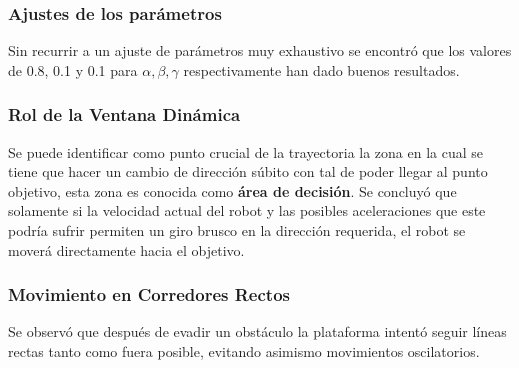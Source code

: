 \documentclass[10pt]{article}
\begin{document}
\subsubsection*{Ajustes de los parámetros}
Sin recurrir a un ajuste de parámetros muy exhaustivo se encontró que los valores de 0.8, 0.1 y 0.1 para $\alpha, \beta, \gamma$ respectivamente han dado buenos resultados.

\subsubsection*{Rol de la Ventana Dinámica}
Se puede identificar como punto crucial de la trayectoria la zona en la cual se tiene que hacer un cambio de dirección súbito con tal de poder llegar al punto objetivo, esta zona es conocida como \textbf{área de decisión}. Se concluyó que solamente si la velocidad actual del robot y las posibles aceleraciones que este podría sufrir permiten un giro brusco en la dirección requerida, el robot se moverá directamente hacia el objetivo.

\subsubsection*{Movimiento en Corredores Rectos}
Se observó que después de evadir un obstáculo la plataforma intentó seguir líneas rectas tanto como fuera posible, evitando asimismo movimientos oscilatorios.



\end{document}
